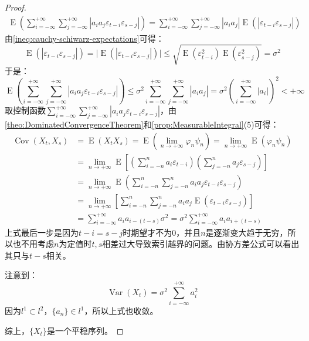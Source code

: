 \begin{proof}
\begin{align*}
		\operatorname{E}\left(\sum_{i=-\infty}^{+\infty}\sum_{j=-\infty}^{+\infty}|a_ia_j\varepsilon_{t-i}\varepsilon_{s-j}|\right)=\sum_{i=-\infty}^{+\infty}\sum_{j=-\infty}^{+\infty}|a_ia_j|\operatorname{E}(|\varepsilon_{t-i}\varepsilon_{s-j}|)
	\end{align*}
	由\cref{ineq:cauchy-schiwarz-expectations}可得：
	\begin{equation*}
		\operatorname{E}(|\varepsilon_{t-i}\varepsilon_{s-j}|)=\Big|\operatorname{E}(|\varepsilon_{t-i}\varepsilon_{s-j}|)\Big|\leqslant\sqrt{\operatorname{E}(\varepsilon_{t-i}^2)\operatorname{E}(\varepsilon_{s-j}^2)}=\sigma^2
	\end{equation*}
	于是：
	\begin{equation*}
		\operatorname{E}\left(\sum_{i=-\infty}^{+\infty}\sum_{j=-\infty}^{+\infty}|a_ia_j\varepsilon_{t-i}\varepsilon_{s-j}|\right)\leqslant\sigma^2\sum_{i=-\infty}^{+\infty}\sum_{j=-\infty}^{+\infty}|a_ia_j|=\sigma^2\left(\sum_{i=-\infty}^{+\infty}|a_i|\right)^2<+\infty
	\end{equation*}
	取控制函数$\sum\limits_{i=-\infty}^{+\infty}\sum\limits_{j=-\infty}^{+\infty}|a_ia_j\varepsilon_{t-i}\varepsilon_{s-j}|$，由\cref{theo:DominatedConvergenceTheorem}和\cref{prop:MeasurableIntegral}(5)可得：
	\begin{align*}
		\operatorname{Cov}(X_t,X_s)&=\operatorname{E}(X_tX_s)=\operatorname{E}\left(\lim_{n\to+\infty}\varphi_n\psi_n\right)=\lim_{n\to+\infty}\operatorname{E}(\varphi_n\psi_n) \\
		&=\lim_{n\to+\infty}\operatorname{E}\left[\left(\sum_{i=-n}^{n}a_i\varepsilon_{t-i}\right)\left(\sum_{j=-n}^{n}a_j\varepsilon_{s-j}\right)\right] \\
		&=\lim_{n\to+\infty}\operatorname{E}\left(\sum_{i=-n}^{n}\sum_{j=-n}^{n}a_ia_j\varepsilon_{t-i}\varepsilon_{s-j}\right) \\
		&=\lim_{n\to+\infty}\left[\sum_{i=-n}^{n}\sum_{j=-n}^{n}a_ia_j\operatorname{E}(\varepsilon_{t-i}\varepsilon_{s-j})\right] \\
		&=\sum_{i=-\infty}^{+\infty}a_ia_{i-(t-s)}\sigma^2=\sigma^2\sum_{i=-\infty}^{+\infty}a_ia_{i+(t-s)}
	\end{align*}
	上式最后一步是因为$t-i=s-j$时期望才不为$0$，并且$n$是逐渐变大趋于无穷，所以也不用考虑$n$为定值时$t,s$相差过大导致索引越界的问题。由协方差公式可以看出其只与$t-s$相关。\par
	注意到：
	\begin{equation*}
		\operatorname{Var}(X_t)=\sigma^2\sum_{i=-\infty}^{+\infty}a_i^2
	\end{equation*}
	因为$l^1\subset l^2$，$\{a_n\}\in l^1$，所以上式也收敛。\par
	综上，$\{X_t\}$是一个平稳序列。
\end{proof}
